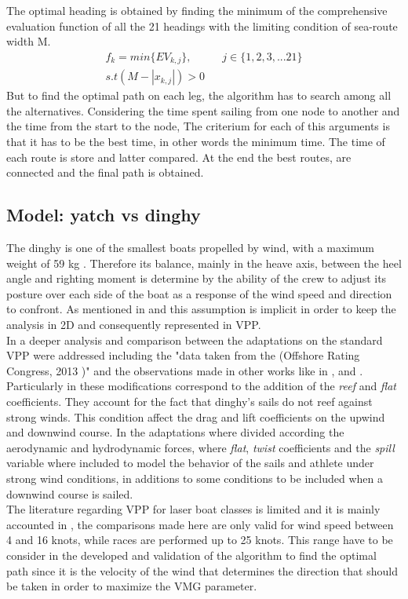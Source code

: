 The optimal heading is obtained by finding the minimum of the comprehensive evaluation function of all the 21 headings with the limiting condition of sea-route width M.
\begin{equation}
\label{optheadxing}
\begin{aligned}
f_{k}=min \{EV_{k,j} \}, & &  j \in \{1,2,3,...21\} \\
s.t (M-|x_{k,j}|) > 0
\end{aligned}
\end{equation}
But to find the optimal path on each leg, the algorithm has to search among all the alternatives. Considering the time spent sailing from one node to another and  the time from the start to the node, The criterium for each of this arguments is that it has to be the best time, in other words the minimum time. The time of each route is store and latter compared. At the end the best routes, are connected and the final path is obtained. \\
\subsection{Model: yatch vs dinghy}
The dinghy is one of the smallest boats propelled by wind, with a maximum weight of 59 kg \cite{sailoly}. Therefore its balance, mainly in the heave axis, between the heel angle and righting moment is determine by the ability of the crew to adjust its posture over each side of the boat \cite{marchajaereo1979} as a response of the wind speed and direction to confront.  As mentioned in \cite{philpott1993yacht} and \cite{larsonprinciples} this assumption is implicit in order to keep the analysis in 2D and consequently represented in VPP.  \\
In \cite{day2017performance} a deeper analysis and comparison between the adaptations on the standard VPP were addressed including the  "data taken from the  (Offshore Rating Congress, 2013 )" and the observations made in other works like in  \cite{carrico17symp}, \cite{binns2002development} and \cite{flay1996twisted}. Particularly in \cite{carrico17symp} these modifications correspond to the addition of the \textit{reef} and \textit{flat} coefficients. They account for the fact that dinghy's sails do not reef against strong winds. This condition affect the drag and lift coefficients on the upwind and downwind course. In \cite{day2017performance} the adaptations where divided according  the aerodynamic and hydrodynamic forces, where \textit{flat}, \textit{twist} coefficients and the \textit{spill} variable where included to model the behavior of the sails and athlete under strong wind conditions, in additions to some conditions to be included when a downwind course is sailed. \\
The literature regarding VPP for laser boat classes is limited and it is mainly accounted in \cite{day2017performance}, the comparisons made here are only valid for wind speed between  4 and 16 knots, while races are performed up to 25 knots. This range have to be consider in the developed and validation of the algorithm to find the optimal path since it is the velocity of the wind that determines the direction that should be taken in order to maximize the VMG parameter. \\

